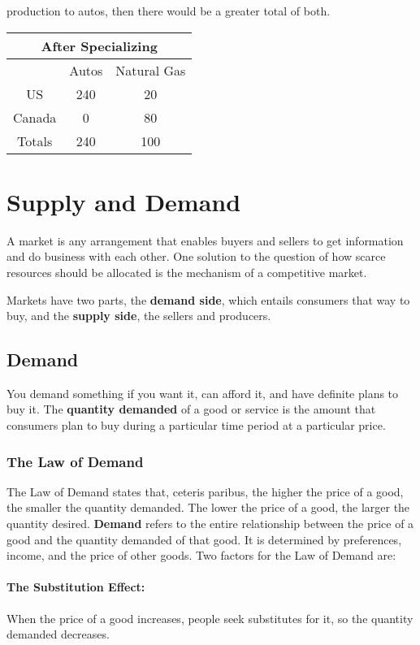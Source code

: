 \documentclass[letterpaper, 12pt]{article}
\begin{document}
production to autos, then there would be a greater total of both.
\begin{center}
  \begin{tabular}{|c|c|c|}
    \hline
    \multicolumn{3}{|c|}{After Specializing} \\ \hline
           & Autos & Natural Gas  \\ \hline
    US     & 240 & 20             \\ \hline
    Canada & 0   & 80             \\ \hline
    Totals & 240 & 100            \\ \hline
  \end{tabular}
\end{center}

\section{Supply and Demand}
A market is any arrangement that enables buyers and sellers to get information
and do business with each other. One solution to the question of how scarce
resources should be allocated is the mechanism of a competitive market. \par
Markets have two parts, the \textbf{demand side}, which entails consumers
that way to buy, and the \textbf{supply side}, the sellers and producers.

\subsection{Demand}
You demand something if you want it, can afford it, and have definite plans to
buy it. The \textbf{quantity demanded} of a good or service is the amount that
consumers plan to buy during a particular time period at a particular price.

\subsubsection{The Law of Demand}
The Law of Demand states that, ceteris paribus, the higher the price
of a good, the smaller the quantity demanded. The lower the price of a good,
the larger the quantity desired. \textbf{Demand} refers to the entire
relationship between the price of a good and the quantity demanded of that
good. It is determined by preferences, income, and the price of other goods.
Two  factors for the Law of Demand are:

\paragraph{The Substitution Effect:}
When the price of a good increases, people seek substitutes for it, so the
quantity demanded decreases.
\end{document}
